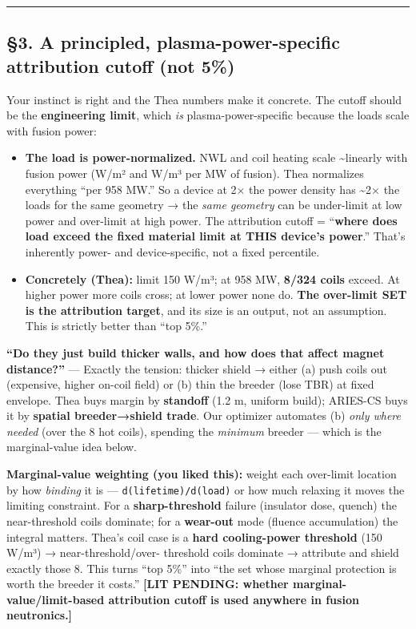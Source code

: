 \documentclass[
]{article}
\providecommand{\tightlist}{%
  \setlength{\itemsep}{0pt}\setlength{\parskip}{0pt}}
\begin{document}
\begin{center}\rule{0.5\linewidth}{0.5pt}\end{center}

\subsection{§3. A principled, plasma-power-specific attribution cutoff
(not
5\%)}\label{a-principled-plasma-power-specific-attribution-cutoff-not-5}

Your instinct is right and the Thea numbers make it concrete. The cutoff
should be the \textbf{engineering limit}, which \emph{is}
plasma-power-specific because the loads scale with fusion power:

\begin{itemize}
\tightlist
\item
  \textbf{The load is power-normalized.} NWL and coil heating scale
  \textasciitilde linearly with fusion power (W/m² and W/m³ per MW of
  fusion). Thea normalizes everything ``per 958 MW.'' So a device at 2×
  the power density has \textasciitilde2× the loads for the same
  geometry → the \emph{same geometry} can be under-limit at low power
  and over-limit at high power. The attribution cutoff = ``\textbf{where
  does load exceed the fixed material limit at THIS device's power}.''
  That's inherently power- and device-specific, not a fixed percentile.
\item
  \textbf{Concretely (Thea):} limit 150 W/m³; at 958 MW, \textbf{8/324
  coils} exceed. At higher power more coils cross; at lower power none
  do. \textbf{The over-limit SET is the attribution target}, and its
  size is an output, not an assumption. This is strictly better than
  ``top 5\%.''
\end{itemize}

\textbf{``Do they just build thicker walls, and how does that affect
magnet distance?''} --- Exactly the tension: thicker shield → either (a)
push coils out (expensive, higher on-coil field) or (b) thin the breeder
(lose TBR) at fixed envelope. Thea buys margin by \textbf{standoff} (1.2
m, uniform build); ARIES-CS buys it by \textbf{spatial breeder→shield
trade}. Our optimizer automates (b) \emph{only where needed} (over the 8
hot coils), spending the \emph{minimum} breeder --- which is the
marginal-value idea below.

\textbf{Marginal-value weighting (you liked this):} weight each
over-limit location by how \emph{binding} it is ---
\texttt{d(lifetime)/d(load)} or how much relaxing it moves the limiting
constraint. For a \textbf{sharp-threshold} failure (insulator dose,
quench) the near-threshold coils dominate; for a \textbf{wear-out} mode
(fluence accumulation) the integral matters. Thea's coil case is a
\textbf{hard cooling-power threshold} (150 W/m³) → near-threshold/over-
threshold coils dominate → attribute and shield exactly those 8. This
turns ``top 5\%'' into ``the set whose marginal protection is worth the
breeder it costs.'' \textbf{{[}LIT PENDING: whether
marginal-value/limit-based attribution cutoff is used anywhere in fusion
neutronics.{]}}
\end{document}
